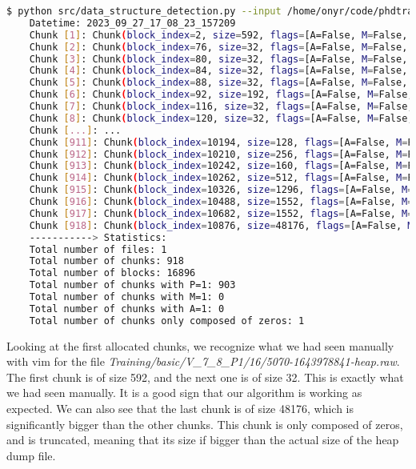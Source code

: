     \begin{lstlisting}[language=bash, caption={Testing chunk parsing on \textit{Training/basic/V\_7\_1\_P1/24/17016-1643962152-heap.raw}. Partial log output. }]
$ python src/data_structure_detection.py --input /home/onyr/code/phdtrack/phdtrack_data_clean/Training/Training/basic/V_7_1_P1/24/17016-1643962152-heap.raw --debug
    Datetime: 2023_09_27_17_08_23_157209
    Chunk [1]: Chunk(block_index=2, size=592, flags=[A=False, M=False, P=True])
    Chunk [2]: Chunk(block_index=76, size=32, flags=[A=False, M=False, P=True])
    Chunk [3]: Chunk(block_index=80, size=32, flags=[A=False, M=False, P=True])
    Chunk [4]: Chunk(block_index=84, size=32, flags=[A=False, M=False, P=True])
    Chunk [5]: Chunk(block_index=88, size=32, flags=[A=False, M=False, P=True])
    Chunk [6]: Chunk(block_index=92, size=192, flags=[A=False, M=False, P=True])
    Chunk [7]: Chunk(block_index=116, size=32, flags=[A=False, M=False, P=True])
    Chunk [8]: Chunk(block_index=120, size=32, flags=[A=False, M=False, P=True])
    Chunk [...]: ...
    Chunk [911]: Chunk(block_index=10194, size=128, flags=[A=False, M=False, P=True])
    Chunk [912]: Chunk(block_index=10210, size=256, flags=[A=False, M=False, P=True])
    Chunk [913]: Chunk(block_index=10242, size=160, flags=[A=False, M=False, P=True])
    Chunk [914]: Chunk(block_index=10262, size=512, flags=[A=False, M=False, P=True])
    Chunk [915]: Chunk(block_index=10326, size=1296, flags=[A=False, M=False, P=True])
    Chunk [916]: Chunk(block_index=10488, size=1552, flags=[A=False, M=False, P=True])
    Chunk [917]: Chunk(block_index=10682, size=1552, flags=[A=False, M=False, P=True])
    Chunk [918]: Chunk(block_index=10876, size=48176, flags=[A=False, M=False, P=True])
    -----------> Statistics:
    Total number of files: 1
    Total number of chunks: 918
    Total number of blocks: 16896
    Total number of chunks with P=1: 903
    Total number of chunks with M=1: 0
    Total number of chunks with A=1: 0
    Total number of chunks only composed of zeros: 1
    \end{lstlisting}

    Looking at the first allocated chunks, we recognize what we had seen manually with vim for the file \textit{Training/basic/V\_7\_8\_P1/16/5070-1643978841-heap.raw}. The first chunk is of size 592, and the next one is of size 32. This is exactly what we had seen manually. It is a good sign that our algorithm is working as expected. We can also see that the last chunk is of size 48176, which is significantly bigger than the other chunks. This chunk is only composed of zeros, and is truncated, meaning that its size if bigger than the actual size of the heap dump file. 
    
